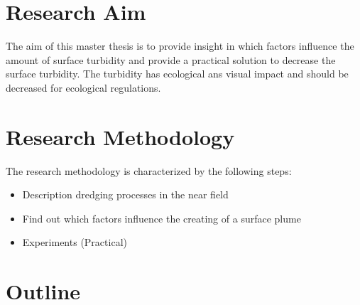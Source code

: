 \section{Research Aim}

The aim of this master thesis is to provide insight in which factors influence the amount of surface turbidity and provide a practical solution to decrease the surface turbidity. The turbidity has ecological ans visual impact and should be decreased for ecological regulations.


\section{Research Methodology}

\noindent The research methodology is characterized by the following steps:
\begin{itemize}
    \item Description dredging processes in the near field
    \item Find out which factors influence the creating of a surface plume
    \item Experiments (Practical)
\end{itemize}  







\section{Outline}






